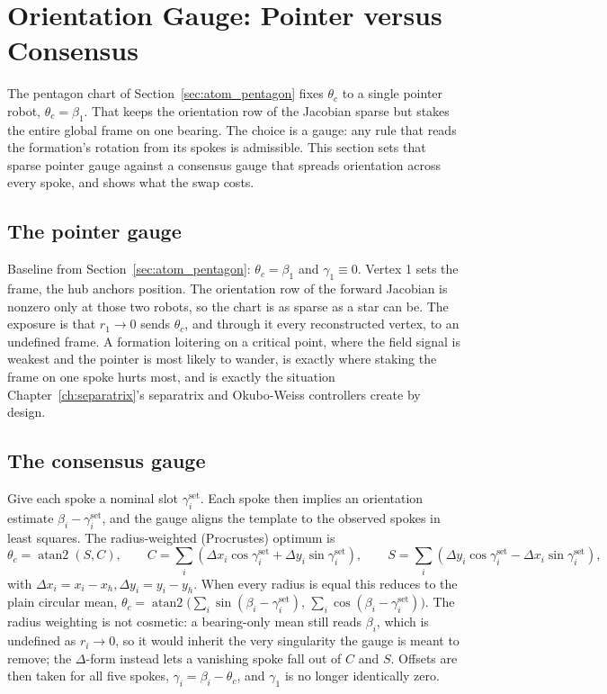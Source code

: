 \documentclass[12pt, letterpaper, oneside]{report}
\begin{document}
\section{Orientation Gauge: Pointer versus Consensus}
\label{sec:gauge}

The pentagon chart of Section~\ref{sec:atom_pentagon} fixes $\theta_c$ to a
single pointer robot, $\theta_c=\beta_1$. That keeps the orientation row of
the Jacobian sparse but stakes the entire global frame on one bearing. The
choice is a gauge: any rule that reads the formation's rotation from its
spokes is admissible. This section sets that sparse pointer gauge against a
consensus gauge that spreads orientation across every spoke, and shows what
the swap costs.

\subsection{The pointer gauge}

Baseline from Section~\ref{sec:atom_pentagon}: $\theta_c=\beta_1$ and
$\gamma_1\equiv0$. Vertex 1 sets the frame, the hub anchors position. The
orientation row of the forward Jacobian is nonzero only at those two
robots, so the chart is as sparse as a star can be. The exposure is that
$r_1\to0$ sends $\theta_c$, and through it every reconstructed vertex, to an
undefined frame. A formation loitering on a critical point, where the field
signal is weakest and the pointer is most likely to wander, is exactly
where staking the frame on one spoke hurts most, and is exactly the
situation Chapter~\ref{ch:separatrix}'s separatrix and Okubo-Weiss
controllers create by design.

\subsection{The consensus gauge}

Give each spoke a nominal slot $\gamma_i^{\text{set}}$. Each spoke then
implies an orientation estimate $\beta_i-\gamma_i^{\text{set}}$, and the
gauge aligns the template to the observed spokes in least squares. The
radius-weighted (Procrustes) optimum is
\begin{equation}
\theta_c = \operatorname{atan2}(S,C), \qquad
C = \sum_i\left(\Delta x_i\cos\gamma_i^{\text{set}} + \Delta y_i \sin\gamma_i^{\text{set}}\right), \qquad
S = \sum_i\left(\Delta y_i\cos\gamma_i^{\text{set}} - \Delta x_i \sin\gamma_i^{\text{set}}\right),
\label{eq:consensus_theta}
\end{equation}
with $\Delta x_i=x_i-x_h,\Delta y_i=y_i-y_h$. When every radius is equal
this reduces to the plain circular mean,
$\theta_c=\operatorname{atan2}\big(\sum_i\sin(\beta_i-\gamma_i^{\text{set}}),\,\sum_i\cos(\beta_i-\gamma_i^{\text{set}})\big)$.
The radius weighting is not cosmetic: a bearing-only mean still reads
$\beta_i$, which is undefined as $r_i\to0$, so it would inherit the very
singularity the gauge is meant to remove; the $\Delta$-form instead lets a
vanishing spoke fall out of $C$ and $S$. Offsets are then taken for all five
spokes, $\gamma_i=\beta_i-\theta_c$, and $\gamma_1$ is no longer identically
zero.
\end{document}
